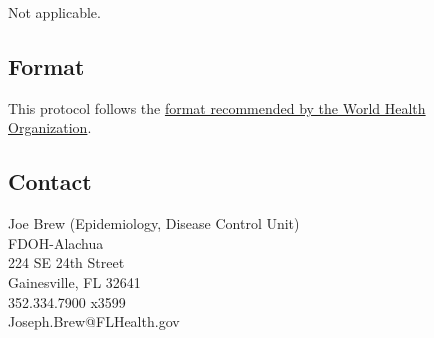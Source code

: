 \documentclass{article}
\begin{document}
\begin{multicols}{2}
Not applicable.

\subsection*{Format}
This protocol follows the \href{http://www.who.int/rpc/research_ethics/format_rp/en/}{format recommended by the World Health Organization}. \\

\subsection*{Contact}
Joe Brew (Epidemiology, Disease Control Unit) \\
FDOH-Alachua \\
224 SE 24th Street \\
Gainesville, FL 32641\\
352.334.7900 x3599 \\
Joseph.Brew@FLHealth.gov



\end{multicols}
\end{document}
